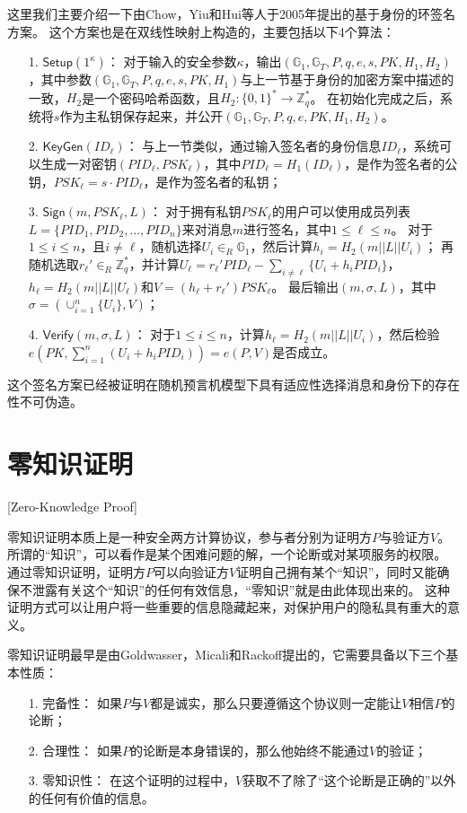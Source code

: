这里我们主要介绍一下由Chow，Yiu和Hui等人于2005年提出的基于身份的环签名方案\cite{chow2005efficient}。
这个方案也是在双线性映射上构造的，主要包括以下4个算法：

\begin{itemize}
  \item[1.] $\mathsf{Setup}(1^\kappa)$： 对于输入的安全参数$\kappa$，输出$(\mathbb{G}_1,\mathbb{G}_T,P,q,e,s,PK,H_1,H_2)$，其中参数$(\mathbb{G}_1,\mathbb{G}_T,P,q,e,s,PK,H_1)$与上一节基于身份的加密方案中描述的一致，$H_2$是一个密码哈希函数，且$H_2:\{0,1\}^*\rightarrow\mathbb{Z}_q^*$。
  在初始化完成之后，系统将$s$作为主私钥保存起来，并公开$(\mathbb{G}_1,\mathbb{G}_T,P,q,e,PK,H_1,H_2)$。
  \item[2.] $\mathsf{KeyGen}(ID_\ell)$： 与上一节类似，通过输入签名者的身份信息$ID_\ell$，系统可以生成一对密钥$(PID_\ell,PSK_\ell)$，其中$PID_\ell=H_1(ID_\ell)$，是作为签名者的公钥，$PSK_\ell=s\cdot PID_\ell$，是作为签名者的私钥；
  \item[3.] $\mathsf{Sign}(m,PSK_\ell,L)$： 对于拥有私钥$PSK_\ell$的用户可以使用成员列表$L=\{PID_1,PID_2,...,PID_n\}$来对消息$m$进行签名，其中$1\leq \ell\leq n$。
  对于$1\leq i \leq n$，且$i\neq \ell$，随机选择$U_i\in_R\mathbb{G}_1$，然后计算$h_i=H_2(m||L||U_i)$；
  再随机选取$r_\ell'\in_R\mathbb{Z}_q^*$，并计算$U_\ell=r_\ell'PID_\ell-\sum_{i\neq \ell}\{U_i+h_i PID_i\}$，$h_\ell=H_2(m||L||U_\ell)$和$V=(h_\ell+r_\ell')PSK_\ell$。
  最后输出$(m,\sigma,L)$，其中$\sigma=(\cup_{i=1}^n\{U_i\},V)$；
  \item[4.] $\mathsf{Verify}(m,\sigma,L)$： 对于$1\leq i \leq n$，计算$h_\ell=H_2(m||L||U_i)$，然后检验$e(PK,\sum_{i=1}^n(U_i+h_iPID{_i}))=e(P,V)$是否成立。
\end{itemize}

这个签名方案已经被证明在随机预言机模型下具有适应性选择消息和身份下的存在性不可伪造\cite{chow2005efficient}。

\section{零知识证明}[Zero-Knowledge Proof]

零知识证明本质上是一种安全两方计算协议，参与者分别为证明方$P$与验证方$V$。
所谓的“知识”，可以看作是某个困难问题的解，一个论断或对某项服务的权限。
通过零知识证明，证明方$P$可以向验证方$V$证明自己拥有某个“知识”，同时又能确保不泄露有关这个“知识”的任何有效信息，“零知识”就是由此体现出来的。
这种证明方式可以让用户将一些重要的信息隐藏起来，对保护用户的隐私具有重大的意义。

零知识证明最早是由Goldwasser，Micali和Rackoff提出的\cite{goldwasser1989knowledge}，它需要具备以下三个基本性质：
\begin{itemize}
  \item[1.] 完备性： 如果$P$与$V$都是诚实，那么只要遵循这个协议则一定能让$V$相信$P$的论断；
  \item[2.] 合理性： 如果$P$的论断是本身错误的，那么他始终不能通过$V$的验证；
  \item[3.] 零知识性： 在这个证明的过程中，$V$获取不了除了“这个论断是正确的”以外的任何有价值的信息。
\end{itemize}

